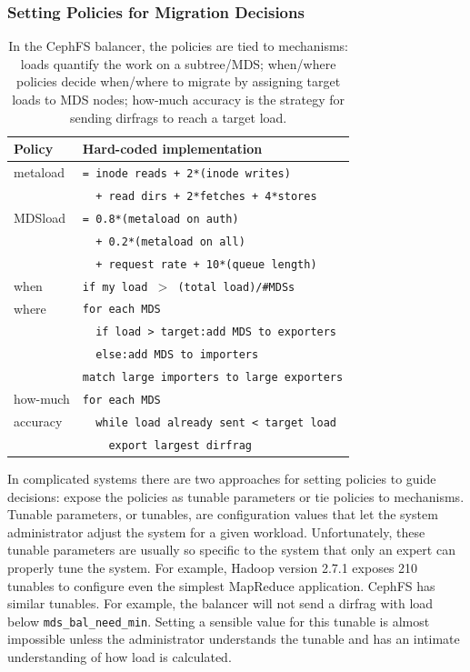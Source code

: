 \subsubsection{Setting Policies for Migration Decisions}
\label{setting-policies-for-migration-decisions}
\begin{table}[tb]
	\centering
	\ssp
	\begin{tabular}{ >{}p{3cm} | >{}p{10cm}}
		\centering\textbf{Policy} & \centering\textbf{Hard-coded implementation}
		\tabularnewline\hline		
		metaload	 	& \small{\texttt{= inode reads + 2*(inode writes)}}\tabularnewline
					 	& \small{\texttt{~~+ read dirs + 2*fetches + 4*stores}}\tabularnewline        
		MDSload      	& \small{\texttt{= 0.8*(metaload on auth)}}\tabularnewline
        				& \small{\texttt{~~+ 0.2*(metaload on all)}}\tabularnewline
        				& \small{\texttt{~~+ request rate + 10*(queue length)}}\tabularnewline
		when			& \small{\texttt{if my load \(>\) (total load)/\#MDSs}}\tabularnewline
        
		where			& \small{\texttt{for each MDS}}\tabularnewline	
          			& \small{\texttt{~~if load > target:add MDS to exporters}}
		\tabularnewline	& \small{\texttt{~~else:add MDS to importers}}
		\tabularnewline	& \small{\texttt{match large importers to large exporters}}\tabularnewline	
        
		how-much 		& \small{\texttt{for each MDS}}\tabularnewline
        accuracy		& \small{\texttt{~~while load already sent < target load}} \tabularnewline
        				& \small{\texttt{~~~~export largest dirfrag}}\tabularnewline
	\end{tabular}	
	\dsp
   	\caption{In the CephFS balancer, the policies are tied to mechanisms: loads quantify the work on a subtree/MDS; when/where policies decide when/where to migrate by assigning target loads to MDS nodes; how-much accuracy is the strategy for sending dirfrags to reach a target load.\label{table:policies}}    
\end{table}	

In complicated systems there are two approaches for setting policies to guide decisions: expose the policies as tunable parameters or tie policies to mechanisms. Tunable parameters, or tunables, are configuration values that let the system administrator adjust the system for a given workload. Unfortunately, these tunable parameters are usually so specific to the system that only an expert can properly tune the system. For example, Hadoop version 2.7.1 exposes 210 tunables to configure even the simplest MapReduce application. CephFS has similar tunables. For example, the balancer  will not send a dirfrag with load below \texttt{mds\_bal\_need\_min}. Setting a sensible value for this tunable is almost impossible unless the administrator understands the tunable and  has an intimate understanding of how load is calculated.

